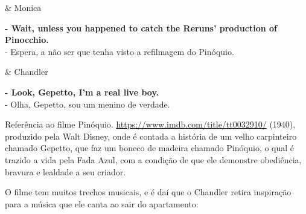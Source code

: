 \begin{tcolorbox}[enhanced,center upper,
    drop fuzzy shadow southeast, boxrule=0.3pt,
    lower separated=false,
    colframe=black!30!dialogoBorder,colback=white]
\begin{minipage}[c]{0.14\linewidth}
   & \centering \scriptsize{Monica}
\end{minipage}
\hspace{.1mm}
\begin{minipage}[c]{0.8\linewidth}
  \textbf{- Wait, unless you happened to catch the Reruns' production of Pinocchio.}\\
  - Espera, a não ser que tenha visto a refilmagem do Pinóquio.
\end{minipage}

\begin{minipage}[c]{0.14\linewidth}
   & \centering \scriptsize{Chandler}
\end{minipage}
\hspace{.1mm}
\begin{minipage}[c]{0.8\linewidth}
  \textbf{- Look, Gepetto, I'm a real live boy.}\\
  - Olha, Gepetto, sou um menino de verdade.
\end{minipage}
\end{tcolorbox}

Referência ao filme
\sloppy Pinóquio. \url{https://www.imdb.com/title/tt0032910/} (1940),
produzido pela Walt Disney, onde é contada a história de um velho
carpinteiro chamado Gepetto, que faz um boneco de madeira chamado
Pinóquio, o qual é trazido a vida pela Fada Azul, com a condição de que
ele demonstre obediência, bravura e lealdade a seu criador.

O filme tem muitos trechos musicais, e é daí que o Chandler retira
inspiração para a música que ele canta ao sair do apartamento:

